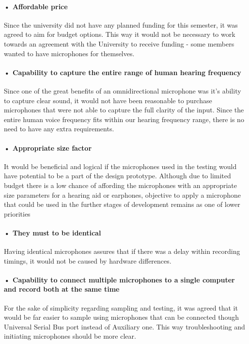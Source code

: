 \paragraph{• Affordable price\\}   
Since the university did not have any planned funding for this semester, it was agreed to aim for budget options. This way it would not be necessary to work towards an agreement with the University to receive funding - some members wanted to have microphones for themselves.
\paragraph{• Capability to capture the entire range of human hearing frequency\\}   
Since one of the great benefits of an omnidirectional microphone was it's ability to capture clear sound, it would not have been reasonable to purchase microphones that were not able to capture the full clarity of the input. Since the entire human voice frequency fits within our hearing frequency range, there is no need to have any extra requirements.
\paragraph{• Appropriate size factor\\}    
It would be beneficial and logical if the microphones used in the testing would have potential to be a part of the design prototype. Although due to limited budget there is a low chance of affording the microphones with an appropriate size parameters for a hearing aid or earphones, objective to apply a microphone that could be used in the further stages of development remains as one of lower priorities    
\paragraph{• They must to be identical\\}    
Having identical microphones assures that if there was a delay within recording timings, it would not be caused by hardware differences.
\paragraph{• Capability to connect multiple microphones to a single computer and record both at the same time\\}   
For the sake of simplicity regarding sampling and testing, it was agreed that it would be far easier to sample using microphones that can be connected though Universal Serial Bus port instead of Auxiliary one. This way troubleshooting and initiating microphones should be more clear. 

